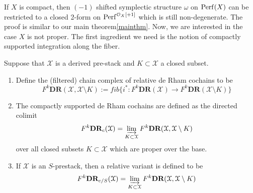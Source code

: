 If $X$ is compact, then $(-1)$ shifted symplectic structure $\omega$ on $\mathrm{Perf}(X)$ can be restricted to a closed 2-form on $\mathrm{Perf}^{\mathcal{O}_X[+1]}$ which is still non-degenerate. The proof is similar to our main theorem\ref{mainthm}. Now, we are interested in the case $X$ is not proper. The first ingredient we need is the notion of compactly supported integration along the fiber.
\begin{defin}
    Suppose that $\mathcal{X}$ is a derived pre-stack and $K \subset \mathcal{X}$ a closed subset. 
    \begin{enumerate}
    \item Define the (filtered) chain complex of relative de Rham cochains to be 
    \begin{equation*}
        F^k\textbf{DR}(\mathcal{X}, \mathcal{X} \setminus K ) := fib\{i^*: F^k\textbf{DR}(\mathcal{X}) \to F^k\textbf{DR}(\mathcal{X} \setminus K )\}
    \end{equation*}
    \item The compactly supported de Rham cochains are defined as the directed colimit
    \begin{equation*}
        F^k\textbf{DR}_c(\mathcal{X})=\varinjlim_{K \subset  \mathcal{X}} F^k\textbf{DR}(\mathcal{X}, \mathcal{X} \setminus K )
    \end{equation*}
    over all closed subsets $K \subset \mathcal{X}$ which are proper over the base.
    \item If $\mathcal{X}$ is an $S$-prestack, then a relative variant is defined to be 
    \begin{equation*}
        F^k\textbf{DR}_{c/S}(\mathcal{X})=\varinjlim_{K \subset  \mathcal{X}} F^k\textbf{DR}(\mathcal{X}, \mathcal{X} \setminus K )
    \end{equation*}
    \end{enumerate}
\end{defin}

